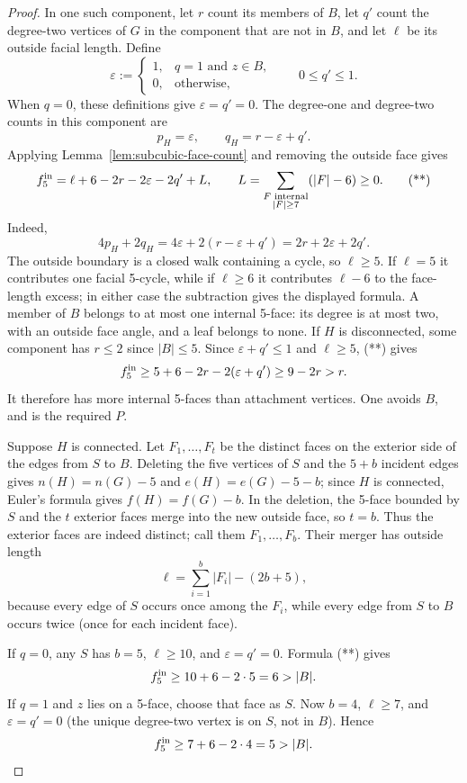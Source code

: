 \documentclass[11pt]{article}
\theoremstyle{remark}
\numberwithin{equation}{section}
\numberwithin{table}{section}
\begin{document}
\begin{proof}
In one such component, let $r$ count its members of $B$, let $q'$
count the degree-two vertices of $G$ in the component that are not in
$B$, and let $\ell$ be its outside facial length.  Define
\[
 \varepsilon:=
 \begin{cases}
  1,&q=1\text{ and }z\in B,\\
  0,&\text{otherwise},
 \end{cases}
 \qquad 0\le q'\le1.
\]
When $q=0$, these definitions give $\varepsilon=q'=0$.
The degree-one and degree-two counts in this component are
\[
    p_H=\varepsilon,\qquad
    q_H=r-\varepsilon+q'.
\]
Applying Lemma~\ref{lem:subcubic-face-count} and removing the outside
face gives
\[
 f^{\rm in}_5=\ell+6-2r-2\varepsilon-2q'+L,\qquad
 L=\sum_{\substack{F\text{ internal}\\|F|\ge7}}(|F|-6)\ge0.       \tag{**}
\]
Indeed,
\[
4p_H+2q_H=4\varepsilon+2(r-\varepsilon+q')
              =2r+2\varepsilon+2q'.
\]
The outside
boundary is a closed walk containing a cycle, so $\ell\ge5$.  If
$\ell=5$ it contributes one facial 5-cycle, while if $\ell\ge6$ it
contributes $\ell-6$ to the face-length excess; in either case the
subtraction gives the displayed formula.
A member of $B$ belongs to at most one internal 5-face: its degree
is at most two, with an outside face angle, and a leaf belongs to none.
If $H$ is disconnected, some component has $r\le2$ since
$|B|\le5$.  Since $\varepsilon+q'\le1$ and $\ell\ge5$, (**) gives
\[
 f^{\rm in}_5\ge 5+6-2r-2(\varepsilon+q')\ge9-2r>r.
\]
It therefore has more internal 5-faces than attachment vertices.
One avoids $B$, and is the required $P$.

Suppose $H$ is connected.  Let $F_1,\ldots,F_t$ be the distinct
faces on the exterior side of the edges from $S$ to $B$.  Deleting
the five vertices of $S$ and the $5+b$ incident edges gives
$n(H)=n(G)-5$ and $e(H)=e(G)-5-b$; since $H$ is connected, Euler's
formula gives $f(H)=f(G)-b$.  In the deletion, the 5-face bounded by
$S$ and the $t$ exterior faces merge into the new outside face, so
$t=b$.  Thus the exterior faces are indeed distinct; call them
$F_1,\ldots,F_b$.  Their merger has outside length
\[
 \ell=\sum_{i=1}^b|F_i|-(2b+5),                       \tag{***}
\]
because every edge of $S$ occurs once among the $F_i$, while every
edge from $S$ to $B$ occurs twice (once for each incident face).

If $q=0$, any $S$ has $b=5$, $\ell\ge10$, and
$\varepsilon=q'=0$.  Formula (**) gives
\[
 f^{\rm in}_5\ge10+6-2\cdot5=6>|B|.
\]
If $q=1$ and $z$ lies on a 5-face, choose that face as $S$. Now $b=4$,
$\ell\ge7$, and $\varepsilon=q'=0$ (the unique degree-two vertex is
on $S$, not in $B$).  Hence
\[
 f^{\rm in}_5\ge7+6-2\cdot4=5>|B|.
\]


\end{proof}
\end{document}
